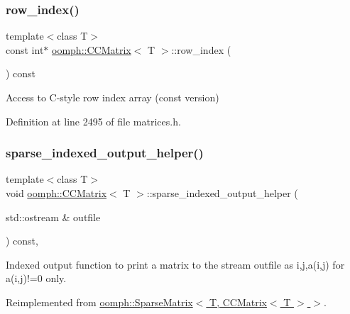 \subsubsection{\texorpdfstring{row\+\_\+index()}{row\_index()}\hspace{0.1cm}{\footnotesize\ttfamily [2/2]}}
{\footnotesize\ttfamily template$<$class T$>$ \\
const int$\ast$ \hyperlink{classoomph_1_1CCMatrix}{oomph\+::\+C\+C\+Matrix}$<$ T $>$\+::row\+\_\+index (\begin{DoxyParamCaption}{ }\end{DoxyParamCaption}) const\hspace{0.3cm}{\ttfamily [inline]}}



Access to C-\/style row index array (const version) 



Definition at line 2495 of file matrices.\+h.

\mbox{\label{classoomph_1_1CCMatrix_a1f6e451f0688c392e45bc03bf20fdda7}} 
\subsubsection{\texorpdfstring{sparse\+\_\+indexed\+\_\+output\+\_\+helper()}{sparse\_indexed\_output\_helper()}}
{\footnotesize\ttfamily template$<$class T$>$ \\
void \hyperlink{classoomph_1_1CCMatrix}{oomph\+::\+C\+C\+Matrix}$<$ T $>$\+::sparse\+\_\+indexed\+\_\+output\+\_\+helper (\begin{DoxyParamCaption}\item[{std\+::ostream \&}]{outfile }\end{DoxyParamCaption}) const\hspace{0.3cm}{\ttfamily [inline]}, {\ttfamily [virtual]}}



Indexed output function to print a matrix to the stream outfile as i,j,a(i,j) for a(i,j)!=0 only. 



Reimplemented from \hyperlink{classoomph_1_1SparseMatrix_a84a08f7e77be50af6a5655cbe0609619}{oomph\+::\+Sparse\+Matrix$<$ T, C\+C\+Matrix$<$ T $>$ $>$}.



